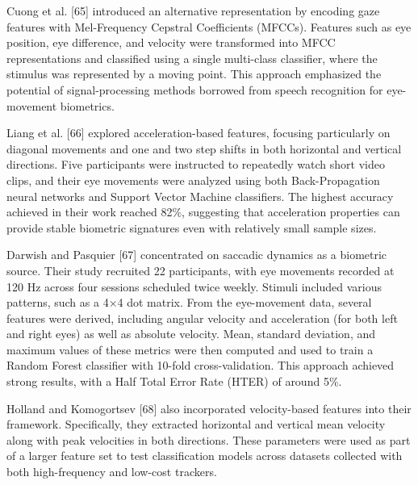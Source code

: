 \documentclass[12pt]{report}
\begin{document}
Cuong et al. [65] introduced an alternative representation by encoding gaze features with Mel-Frequency Cepstral Coefficients (MFCCs). 
Features such as eye position, eye difference, and velocity were transformed into MFCC representations and classified using a single multi-class classifier, where the stimulus was represented by a moving point.
This approach emphasized the potential of signal-processing methods borrowed from speech recognition for eye-movement biometrics.

Liang et al. [66] explored acceleration-based features, focusing particularly on diagonal movements and one and two step shifts in both horizontal and vertical directions.
Five participants were instructed to repeatedly watch short video clips, and their eye movements were analyzed using both Back-Propagation neural networks and Support Vector Machine classifiers. 
The highest accuracy achieved in their work reached 82\%, suggesting that acceleration properties can provide stable biometric signatures even with relatively small sample sizes.

Darwish and Pasquier [67] concentrated on saccadic dynamics as a biometric source. 
Their study recruited 22 participants, with eye movements recorded at 120 Hz across four sessions scheduled twice weekly.
Stimuli included various patterns, such as a 4×4 dot matrix.
From the eye-movement data, several features were derived, including angular velocity and acceleration (for both left and right eyes) as well as absolute velocity. 
Mean, standard deviation, and maximum values of these metrics were then computed and used to train a Random Forest classifier with 10-fold cross-validation. 
This approach achieved strong results, with a Half Total Error Rate (HTER) of around 5\%.

Holland and Komogortsev [68] also incorporated velocity-based features into their framework.
Specifically, they extracted horizontal and vertical mean velocity along with peak velocities in both directions.
These parameters were used as part of a larger feature set to test classification models across datasets collected with both high-frequency and low-cost trackers.
\end{document}
